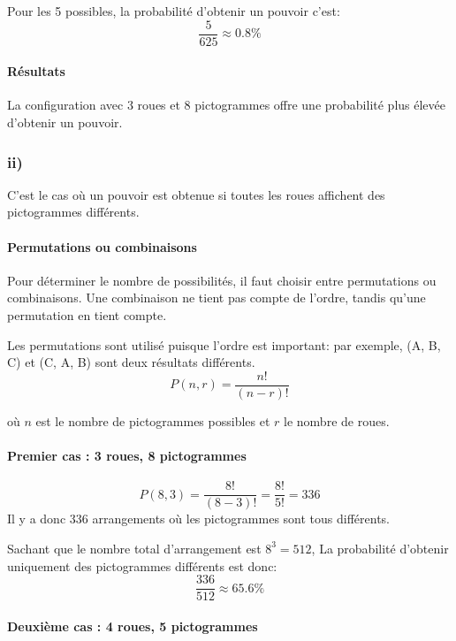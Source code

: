 Pour les 5 possibles, la probabilité d'obtenir un pouvoir c'est: \[
\frac{5}{625} \approx 0.8\%
\]

\paragraph{Résultats}\label{ruxe9sultats}

La configuration avec 3 roues et 8 pictogrammes offre une probabilité
plus élevée d'obtenir un pouvoir.

    \subsubsection{ii)} C'est le cas où un pouvoir est obtenue si toutes les roues affichent des
pictogrammes différents.\label{ii}



\paragraph{Permutations ou
combinaisons}\label{permutations-ou-combinaisons}

Pour déterminer le nombre de possibilités, il faut choisir entre
permutations ou combinaisons. Une combinaison ne tient pas compte de
l'ordre, tandis qu'une permutation en tient compte.

Les permutations sont utilisé puisque l'ordre est important: par
exemple, (A, B, C) et (C, A, B) sont deux résultats différents. \[
P(n,r)=\frac{n!}{(n-r)!}
\]

où \(n\) est le nombre de pictogrammes possibles et \(r\) le nombre de
roues.

\paragraph{Premier cas : 3 roues, 8
pictogrammes}\label{premier-cas-3-roues-8-pictogrammes}

\[
P(8,3)=\frac{8!}{(8-3)!}=\frac{8!}{5!}=336
\] Il y a donc 336 arrangements où les pictogrammes sont tous
différents.

Sachant que le nombre total d'arrangement est \(8^3=512\), La
probabilité d'obtenir uniquement des pictogrammes différents est donc:
\[
\frac{336}{512} \approx 65.6\%
\]

\paragraph{Deuxième cas : 4 roues, 5
pictogrammes}\label{deuxiuxe8me-cas-4-roues-5-pictogrammes}

